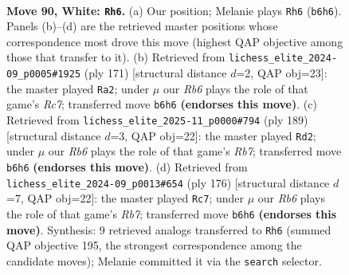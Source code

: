 \documentclass[11pt]{article}
\begin{document}
\clearpage

\begin{figure}[p]\centering
\begin{subfigure}{0.46\textwidth}\centering
\resizebox{\linewidth}{!}{%
\newchessgame
\chessboard[
  setfen={8/k7/1R6/5K2/2N5/8/6P1/3r4 w - - 44 90},
  showmover=false,
  pgfstyle=straightmove, color=movearrow, markmove={b6-h6}
]}
\caption{}
\end{subfigure}\hfill
\begin{subfigure}{0.46\textwidth}\centering
\resizebox{\linewidth}{!}{%
\newchessgame
\chessboard[
  setfen={4R3/8/5k2/8/3n4/8/2r5/3K4 b - - 59 86},
  showmover=false,
  pgfstyle=straightmove, color=movearrow, markmove={c2-a2}
]}
\caption{}
\end{subfigure}
\\[4pt]
\begin{subfigure}{0.46\textwidth}\centering
\resizebox{\linewidth}{!}{%
\newchessgame
\chessboard[
  setfen={8/4R3/8/8/8/3n1k2/1r6/K7 b - - 21 95},
  showmover=false,
  pgfstyle=straightmove, color=movearrow, markmove={b2-d2}
]}
\caption{}
\end{subfigure}\hfill
\begin{subfigure}{0.46\textwidth}\centering
\resizebox{\linewidth}{!}{%
\newchessgame
\chessboard[
  setfen={k7/1R6/3NK3/8/8/8/8/3r4 w - - 51 89},
  showmover=false,
  pgfstyle=straightmove, color=movearrow, markmove={b7-c7}
]}
\caption{}
\end{subfigure}
\caption{\textbf{Move 90, White: \texttt{Rh6}.} (a) Our position; Melanie plays \texttt{Rh6} (\texttt{b6h6}). Panels (b)--(d) are the retrieved master positions whose correspondence most drove this move (highest QAP objective among those that transfer to it). (b) Retrieved from \texttt{lichess\_elite\_2024-09\_p0005\#1925} (ply 171) [structural distance $d$=2, QAP obj=23]: the master played \texttt{Ra2}; under $\mu$ our \emph{Rb6} plays the role of that game's \emph{Rc7}; transferred move \texttt{b6h6} \textbf{(endorses this move)}. (c) Retrieved from \texttt{lichess\_elite\_2025-11\_p0000\#794} (ply 189) [structural distance $d$=3, QAP obj=22]: the master played \texttt{Rd2}; under $\mu$ our \emph{Rb6} plays the role of that game's \emph{Rb7}; transferred move \texttt{b6h6} \textbf{(endorses this move)}. (d) Retrieved from \texttt{lichess\_elite\_2024-09\_p0013\#654} (ply 176) [structural distance $d$=7, QAP obj=22]: the master played \texttt{Rc7}; under $\mu$ our \emph{Rb6} plays the role of that game's \emph{Rb7}; transferred move \texttt{b6h6} \textbf{(endorses this move)}. Synthesis: 9 retrieved analogs transferred to \texttt{Rh6} (summed QAP objective 195, the strongest correspondence among the candidate moves); Melanie committed it via the \texttt{search} selector.}
\label{fig:thought-m178}
\end{figure}
\end{document}
